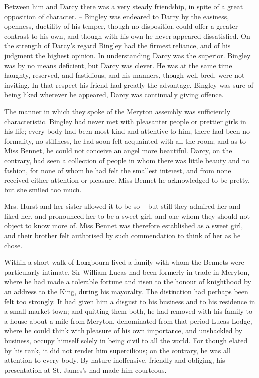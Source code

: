 Between him and Darcy there was a very steady
friendship, in spite of a great opposition of character. --
Bingley was endeared to Darcy by the easiness, openness,
ductility of his temper, though no disposition could offer
a greater contrast to his own, and though with his own he
never appeared dissatisfied. On the strength of Darcy’s
regard Bingley had the firmest reliance, and of his judgment
the highest opinion. In understanding Darcy was
the superior. Bingley was by no means deficient, but
Darcy was clever. He was at the same time haughty,
reserved, and fastidious, and his manners, though well
bred, were not inviting. In that respect his friend had
greatly the advantage. Bingley was sure of being liked
wherever he appeared, Darcy was continually giving
offence.

The manner in which they spoke of the Meryton
assembly was sufficiently characteristic. Bingley had
never met with pleasanter people or prettier girls in his
life; every body had been most kind and attentive to
him, there had been no formality, no stiffness, he had
soon felt acquainted with all the room; and as to Miss
Bennet, he could not conceive an angel more beautiful.
Darcy, on the contrary, had seen a collection of people
in whom there was little beauty and no fashion, for none
of whom he had felt the smallest interest, and from none
received either attention or pleasure. Miss Bennet he
acknowledged to be pretty, but she smiled too much.

Mrs. Hurst and her sister allowed it to be so -- but still
they admired her and liked her, and pronounced her to
be a sweet girl, and one whom they should not object to
know more of. Miss Bennet was therefore established as
a sweet girl, and their brother felt authorised by such
commendation to think of her as he chose.


Within a short walk of Longbourn lived a family with
whom the Bennets were particularly intimate. Sir William
Lucas had been formerly in trade in Meryton, where he had
made a tolerable fortune and risen to the honour of knighthood
by an address to the King, during his mayoralty. The
distinction had perhaps been felt too strongly. It had given
him a disgust to his business and to his residence in a small
market town; and quitting them both, he had removed
with his family to a house about a mile from Meryton,
denominated from that period Lucas Lodge, where he
could think with pleasure of his own importance, and
unshackled by business, occupy himself solely in being
civil to all the world. For though elated by his rank,
it did not render him supercilious; on the contrary, he
was all attention to every body. By nature inoffensive,
friendly and obliging, his presentation at St. James’s had
made him courteous.

